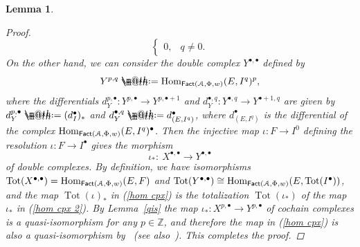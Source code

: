 \documentclass[11pt]{article}
\makeatletter
\numberwithin{equation}{section}
\newtheorem{lem}[dfn]{Lemma}
\newcommand*{\defeq}{\mathrel{\rlap{%
 \raisebox{0.3ex}{$\m@th\cdot$}}%
 \raisebox{-0.3ex}{$\m@th\cdot$}}%
 =}
\numberwithin{equation}{section}
\newcommand{\dgFact}{\operatorname{\sf{Fact}}}
\newcommand{\Hom}{\operatorname{Hom}}
\newcommand{\Tot}{\operatorname{Tot}}
\newcommand{\bZ}{\mathbb{Z}}
\newcommand{\scrA}{\EuScript{A}}
\makeatother
\begin{document}
\begin{lem}
\begin{proof}
\begin{equation*}
\begin{cases}
0,& q\neq 0.
\end{cases}
\end{equation*}
On the other hand, we can consider the double complex $Y^{\bullet,\bullet}$ defined by
\begin{equation*}
Y^{p,q}\defeq\Hom_{\dgFact(\scrA,\Phi,w)}(E,I^q)^p,
\end{equation*}
 where the differentials $d_Y^{p,\bullet}\colon Y^{p,\bullet}\to Y^{p,\bullet+1}$ and $d_Y^{\bullet,q}\colon Y^{\bullet,q}\to Y^{\bullet+1,q}$ are given by $d_Y^{p,\bullet}\defeq (d_I^{\bullet})_*$ and $d_Y^{\bullet,q}\defeq d_{(E,I^q)}^{\bullet}$, where $d_{(E,I^q)}^{\bullet}$ is the differential of the complex $\Hom_{\dgFact(\scrA,\Phi,w)}(E,I^{q})^{\bullet}$. Then the injective map $\iota\colon F\to I^0$ defining the resolution $\iota\colon F\to I^{\bullet}$ gives the morphism
 \begin{equation}\label{hom cpx 2}
 \iota_*\colon\ X^{\bullet,\bullet}\to Y^{\bullet,\bullet}
 \end{equation}
 of double complexes. By definition, we have isomorphisms $\Tot(X^{\bullet,\bullet})=\Hom_{\dgFact(\scrA,\Phi,w)}(E,F)$ and $\Tot(Y^{\bullet,\bullet})\cong\Hom_{\dgFact(\scrA,\Phi,w)}(E,\Tot(I^{\bullet}))$, and the map $\Tot(\iota)_*$ in (\ref{hom cpx}) is the totalization $\Tot(\iota_*)$ of the map $\iota_*$ in (\ref{hom cpx 2}).
By Lemma~\ref{qis} the map $\iota_*\colon X^{p,\bullet}\to Y^{p,\bullet}$ of cochain complexes is a quasi-isomorphism for any $p\in \bZ$, and therefore the map in (\ref{hom cpx}) is also a quasi-isomorphism by~\cite[Theorem~1.9.3]{ks} (see also~\cite[Lemma~2.46]{ls}). This completes the proof.
\end{proof}
\end{lem}
\end{document}
